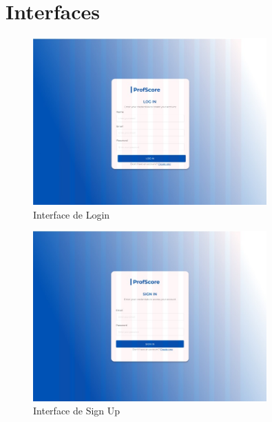 \documentclass[12pt]{article}
\begin{document}
\section{Interfaces}

\begin{figure}[H] %
    \centering
    \includegraphics[width=0.8\textwidth]{interfaces/i1-login.png}
    \caption{Interface de Login}
    \label{fig:i1-login}
\end{figure}

\begin{figure}[H] %
  \centering
  \includegraphics[width=0.8\textwidth]{interfaces/i2-signin.png}
  \caption{Interface de Sign Up}
  \label{fig:i2-signin}
\end{figure}
\end{document}
